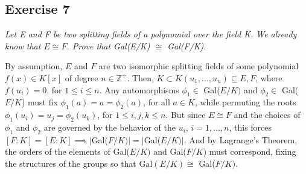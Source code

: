 \subsection*{Exercise 7}
\textit{Let E and F be two splitting fields of a polynomial over the field K. We already know that $E \cong F$. Prove that Gal(E/K) $\cong$ Gal(F/K).}

\vspace{5 mm}
By assumption, $E$ and $F$ are two isomorphic splitting fields of some polynomial $f(x) \in K[x]$ of degree $n \in \mathbb{Z}^+$. Then, $K \subset K(u_1,...,u_n) \subseteq E,F$, where $f(u_i) = 0$, for $1 \le i \le n$. Any automorphisms $\phi_1 \in$ Gal($E/K)$ and $\phi_2 \in$ Gal($F/K$) must fix $\phi_1(a) = a = \phi_2(a)$, for all $a \in K$, while permuting the roots $\phi_1(u_i) = u_j = \phi_2(u_k)$, for $1 \le i,j,k \le n$. But since $E \cong F$ and the choices of $\phi_1$ and $\phi_2$ are governed by the behavior of the $u_i$, $i = 1,...,n$, this forces $[F:K] = [E:K] \implies |$Gal($F/K)| = |$Gal($E/K)|$. And by Lagrange's Theorem, the orders of the elements of Gal($E/K)$ and Gal($F/K$) must correspond, fixing the structures of the groups so that Gal$(E/K) \cong$ Gal($F/K)$.